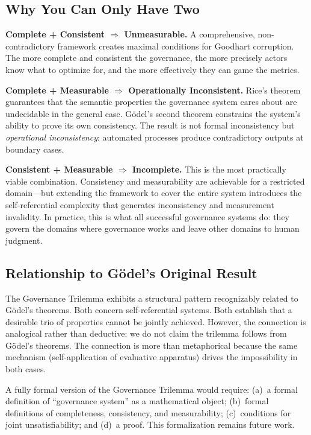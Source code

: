 \documentclass[12pt,a4paper]{article}
\begin{document}
\subsection{Why You Can Only Have Two}

\textbf{Complete + Consistent $\Rightarrow$ Unmeasurable.} A comprehensive,
non-contradictory framework creates maximal conditions for Goodhart
corruption. The more complete and consistent the governance, the more
precisely actors know what to optimize for, and the more effectively they can
game the metrics.

\textbf{Complete + Measurable $\Rightarrow$ Operationally Inconsistent.}
Rice's theorem guarantees that the semantic properties the governance system
cares about are undecidable in the general case. G\"{o}del's second theorem
constrains the system's ability to prove its own consistency. The result is
not formal inconsistency but \emph{operational inconsistency}: automated
processes produce contradictory outputs at boundary cases.

\textbf{Consistent + Measurable $\Rightarrow$ Incomplete.} This is the most
practically viable combination. Consistency and measurability are achievable
for a restricted domain---but extending the framework to cover the entire
system introduces the self-referential complexity that generates
inconsistency and measurement invalidity. In practice, this is what all
successful governance systems do: they govern the domains where governance
works and leave other domains to human judgment.

\subsection{Relationship to G\"{o}del's Original Result}

The Governance Trilemma exhibits a structural pattern recognizably related to
G\"{o}del's theorems. Both concern self-referential systems. Both establish
that a desirable trio of properties cannot be jointly achieved. However, the
connection is analogical rather than deductive: we do not claim the trilemma
follows from G\"{o}del's theorems. The connection is more than metaphorical
because the same mechanism (self-application of evaluative apparatus) drives
the impossibility in both cases.

A fully formal version of the Governance Trilemma would require: (a)~a formal
definition of ``governance system'' as a mathematical object; (b)~formal
definitions of completeness, consistency, and measurability; (c)~conditions
for joint unsatisfiability; and (d)~a proof. This formalization remains future
work.
\end{document}
